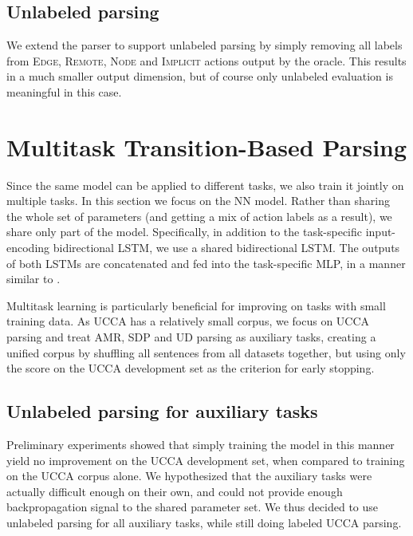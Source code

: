 \documentclass[11pt,a4paper]{article}
\begin{document}
\subsection{Unlabeled parsing}\label{sec:unlabeled}

We extend the parser to support unlabeled parsing by simply removing all labels from
\textsc{Edge}, \textsc{Remote}, \textsc{Node} and \textsc{Implicit} actions output by the oracle.
This results in a much smaller output dimension, but of course only unlabeled evaluation is
meaningful in this case.



\section{Multitask Transition-Based Parsing}\label{sec:multitask}

Since the same model can be applied to different tasks, we also train it jointly on multiple tasks.
In this section we focus on the NN model.
Rather than sharing the whole set of parameters (and getting a mix of action labels as a result),
we share only part of the model.
Specifically, in addition to the task-specific input-encoding bidirectional LSTM,
we use a shared bidirectional LSTM. The outputs of both LSTMs are concatenated and
fed into the task-specific MLP, in a manner similar to \citet{P17-1186}.

Multitask learning is particularly beneficial for improving on tasks with small training data.
As UCCA has a relatively small corpus, we focus on UCCA parsing and treat AMR, SDP and UD parsing
as auxiliary tasks, creating a unified corpus by shuffling all sentences from all datasets together,
but using only the score on the UCCA development set as the criterion for early stopping.

\subsection{Unlabeled parsing for auxiliary tasks}\label{sec:unlabeld}

Preliminary experiments showed that simply training the model in this manner yield no improvement
on the UCCA development set, when compared to training on the UCCA corpus alone.
We hypothesized that the auxiliary tasks were actually difficult enough on their own,
and could not provide enough backpropagation signal to the shared parameter set.
We thus decided to use unlabeled parsing for all auxiliary tasks, while still doing labeled UCCA parsing.
\end{document}
